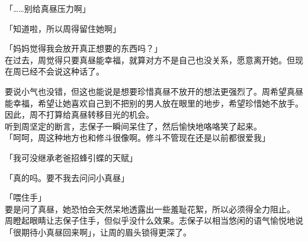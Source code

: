 「……别给真昼压力啊」

「知道啦，所以周得留住她啊」

「妈妈觉得我会放开真正想要的东西吗？」\\

在过去，周觉得只要真昼能幸福，就算对方不是自己也没关系，愿意离开她。但现在周已经不会说这种话了。

要说小气也没错，但这也能说是想要珍惜真昼不放开的想法更强烈了。周希望真昼能幸福，希望让她喜欢自己到不把别的男人放在眼里的地步，希望珍惜她不放手。\\

因此，周不打算给真昼转移目光的机会。\\

听到周坚定的断言，志保子一瞬间呆住了，然后愉快地咯咯笑了起来。\\

「呵呵，周这种地方也和修斗很像啊。修斗不管现在还是以前都很爱我」

「我可没继承老爸招蜂引蝶的天赋」

「真的吗。要不我去问问小真昼」

「喂住手」\\

要是问了真昼，她恐怕会天然呆地透露出一些羞耻花絮，所以必须得全力阻止。\\

周瞪起眼睛让志保子住手，但似乎没什么效果。志保子以相当悠闲的语气愉悦地说「很期待小真昼回来啊」，让周的眉头锁得更深了。
